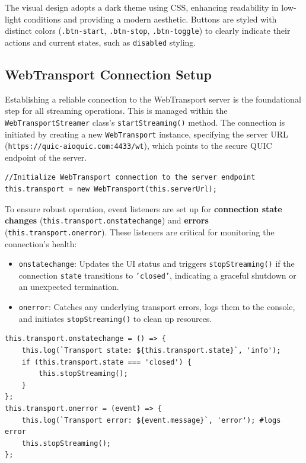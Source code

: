 The visual design adopts a dark theme using CSS, enhancing readability in low-light conditions and providing a modern aesthetic. Buttons are styled with distinct colors (\texttt{.btn-start}, \texttt{.btn-stop}, \texttt{.btn-toggle}) to clearly indicate their actions and current states, such as \texttt{disabled} styling.

\subsection{WebTransport Connection Setup}
Establishing a reliable connection to the WebTransport server is the foundational step for all streaming operations. This is managed within the \texttt{WebTransportStreamer} class's \texttt{startStreaming()} method. The connection is initiated by creating a new \texttt{WebTransport} instance, specifying the server URL (\texttt{https://quic-aioquic.com:4433/wt}), which points to the secure QUIC endpoint of the server.

\begin{lstlisting}[breaklines=true,basicstyle=\small\ttfamily,frame=single]
//Initialize WebTransport connection to the server endpoint
this.transport = new WebTransport(this.serverUrl);
\end{lstlisting}

To ensure robust operation, event listeners are set up for \textbf{connection state changes} (\texttt{this.transport.onstatechange}) and \textbf{errors} (\texttt{this.transport.onerror}). These listeners are critical for monitoring the connection's health:

\begin{itemize}
    \item \texttt{onstatechange}: Updates the UI status and triggers \texttt{stopStreaming()} if the connection \texttt{state} transitions to \texttt{'closed'}, indicating a graceful shutdown or an unexpected termination.
    \item \texttt{onerror}: Catches any underlying transport errors, logs them to the console, and initiates \texttt{stopStreaming()} to clean up resources.
\end{itemize}

\begin{lstlisting}[breaklines=true,basicstyle=\small\ttfamily,frame=single]
this.transport.onstatechange = () => {
    this.log(`Transport state: ${this.transport.state}`, 'info');
    if (this.transport.state === 'closed') {
        this.stopStreaming();
    }
};
this.transport.onerror = (event) => {
    this.log(`Transport error: ${event.message}`, 'error'); #logs error
    this.stopStreaming();
};
\end{lstlisting}

